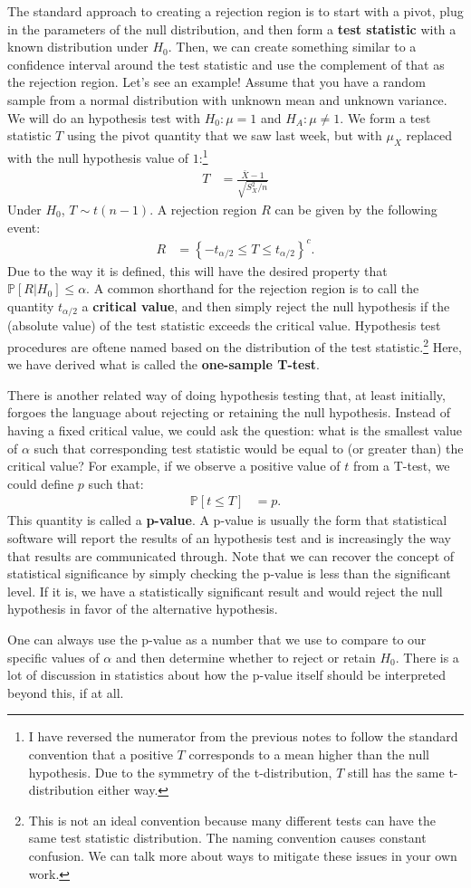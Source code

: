 \documentclass{tufte-handout}
\newcommand{\Prob}{\mathbb{P}}
\begin{document}
The standard approach to creating a rejection region is to start with a
pivot, plug in the parameters of the null distribution, and then form a
\textbf{test statistic} with a known distribution under $H_0$. Then, we
can create something similar to a confidence interval around the test
statistic and use the complement of that as the rejection region. Let's
see an example! Assume that you have a random sample from a normal 
distribution with unknown mean and unknown variance. We will do an 
hypothesis test with $H_0: \mu = 1$ and $H_A: \mu \neq 1$. We form a
test statistic $T$ using the pivot quantity that we saw last week, but
with $\mu_X$ replaced with the null hypothesis value of $1$:\footnote{
  I have reversed the numerator from the previous notes to follow
  the standard convention that a positive $T$ corresponds to a mean
  higher than the null hypothesis. Due to the symmetry of the
  t-distribution, $T$ still has the same t-distribution either way.
}
\begin{align*}
T &= \frac{\bar{X} - 1}{\sqrt{S_X^2 / n}} 
\end{align*}
Under $H_0$, $T \sim t(n-1)$. A rejection region $R$ can be given by
the following event:
\begin{align*}
R &= \left\{ -t_{\alpha/2} \leq T \leq t_{\alpha/2} \right\}^{c}.
\end{align*}
Due to the way it is defined, this will have the desired property that
$\Prob[R|H_0] \leq \alpha$. A common shorthand for the rejection
region is to call the quantity $t_{\alpha/2}$ a \textbf{critical value},
and then simply reject the null hypothesis if the (absolute value) of the
test statistic exceeds the critical value. Hypothesis test procedures
are oftene named based on the distribution of the test statistic.\footnote{
  This is not an ideal convention because many different tests can have
  the same test statistic distribution. The naming convention causes constant
  confusion. We can talk more about ways to mitigate these issues in your own
  work.
}
Here, we have derived what is called the \textbf{one-sample T-test}. 

\vspace*{20pt}

\noindent
There is another related way of doing hypothesis testing that, at least
initially, forgoes the language about rejecting or retaining the null 
hypothesis. Instead of having a fixed critical value, we could ask the
question: what is the smallest value of $\alpha$ such that corresponding
test statistic would be equal to (or greater than) the critical value? 
For example, if we observe a positive value of $t$ from a T-test, we could
define $p$ such that: 
\begin{align*}
\Prob[t \leq T] &= p. 
\end{align*}
This quantity is called a \textbf{p-value}. A p-value is usually the 
form that statistical software will report the results of an hypothesis
test and is increasingly the way that results are communicated through.
Note that we can recover the concept of statistical significance by 
simply checking the p-value is less than the significant level. If it
is, we have a statistically significant result and would reject the null
hypothesis in favor of the alternative hypothesis.

One can always use the p-value as a number that we use to compare to
our specific values of $\alpha$ and then determine whether to reject
or retain $H_0$. There is a lot of discussion in statistics about how
the p-value itself should be interpreted beyond this, if at all. 
\end{document}
